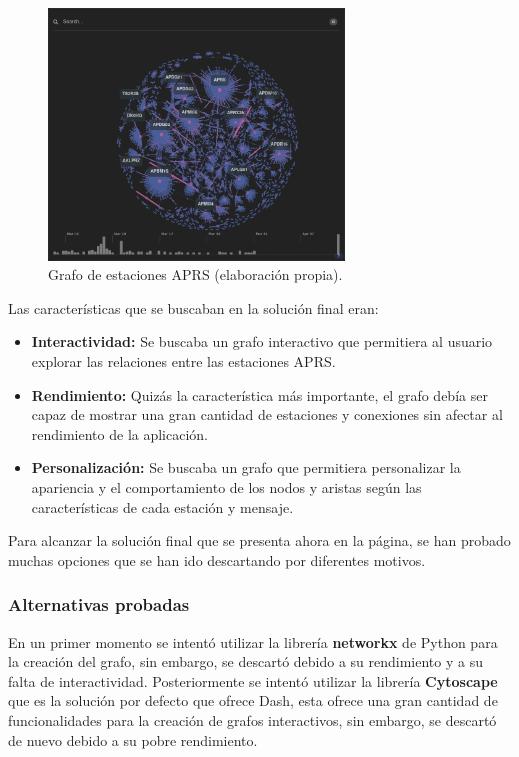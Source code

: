 \begin{figure}[h]
	\centering
	\includegraphics[width=0.7\textwidth]{Imagenes/Chapter_4/graph.png}
	\caption[Grafo de estaciones APRS.]{Grafo de estaciones APRS (elaboración propia).}
	\label{fig:graph}
\end{figure}

Las características que se buscaban en la solución final eran:

\begin{itemize}
	\item \textbf{Interactividad:} Se buscaba un grafo interactivo que permitiera al usuario explorar las relaciones entre las estaciones APRS.
	\item \textbf{Rendimiento:} Quizás la característica más importante, el grafo debía ser capaz de mostrar una gran cantidad de estaciones y conexiones sin afectar al rendimiento de la aplicación.
	\item \textbf{Personalización:} Se buscaba un grafo que permitiera personalizar la apariencia y el comportamiento de los nodos y aristas según las características de cada estación y mensaje.
\end{itemize}
Para alcanzar la solución final que se presenta ahora en la página, se han probado muchas opciones que se han ido descartando por diferentes motivos.
\subsubsection*{Alternativas probadas}
En un primer momento se intentó utilizar la librería \textbf{networkx} de Python para la creación del grafo, sin embargo, se descartó debido a su rendimiento y a su falta de interactividad. Posteriormente se intentó utilizar la librería \textbf{Cytoscape} que es la solución por defecto que ofrece Dash, esta ofrece una gran cantidad de funcionalidades para la creación de grafos interactivos, sin embargo, se descartó de nuevo debido a su pobre rendimiento.

